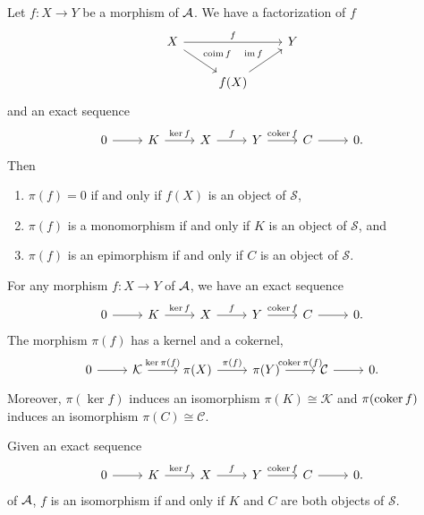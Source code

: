 \documentclass[dissertation.tex]{subfiles}
\begin{document}
\begin{lem}
  Let $f \colon X \rightarrow Y$ be a morphism of $\mathcal{A}$.  
  We have a factorization of $f$
  $$\begin{tikzcd}
    X \arrow{rd}{\coim{f}}\arrow{rr}{f} & & Y\\
    & f(X)\arrow{ur}{\im{f}} & 
  \end{tikzcd}$$
  and an exact sequence 
  $$\begin{tikzcd}
    0 \arrow{r} & K \arrow{r}{\ker{f}} & X \arrow{r}{f} & Y \arrow{r}{\coker{f}} & C \arrow{r} & 0.
  \end{tikzcd}$$
  Then
  \begin{enumerate}
  \item
    $\pi(f) = 0$ if and only if $f(X)$ is an object of $\mathcal{S}$,
  \item
    $\pi(f)$ is a monomorphism if and only if $K$ is an object of $\mathcal{S}$, and
  \item
    $\pi(f)$ is an epimorphism if and only if $C$ is an object of $\mathcal{S}$.
  \end{enumerate}
\end{lem}

\begin{lem}
  For any morphism $f \colon X \rightarrow Y$ of $\mathcal{A}$, we have an exact sequence 
  $$\begin{tikzcd}
    0 \arrow{r} & K \arrow{r}{\ker{f}} & X \arrow{r}{f} & Y \arrow{r}{\coker{f}} & C \arrow{r} & 0.
  \end{tikzcd}$$ 
  The morphism $\pi(f)$ has a kernel and a cokernel,
  $$\begin{tikzcd}
    0 \arrow{r} & \mathcal{K} \arrow{r}{\ker{\pi(f)}} & \pi(X) \arrow{r}{\pi(f)} & \pi(Y) \arrow{r}{\coker{\pi(f)}} & \mathcal{C} \arrow{r} & 0.
  \end{tikzcd}$$
  Moreover, $\pi(\ker{f})$ induces an isomorphism $\pi(K) \cong \mathcal{K}$ and $\pi(\operatorname{coker}{f})$ induces an isomorphism $\pi(C) \cong \mathcal{C}$.
\end{lem}

\begin{lem}
  Given an exact sequence 
  $$\begin{tikzcd}
    0 \arrow{r} & K \arrow{r}{\ker{f}} & X \arrow{r}{f} & Y \arrow{r}{\coker{f}} & C \arrow{r} & 0.
  \end{tikzcd}$$ 
  of $\mathcal{A}$, $f$ is an isomorphism if and only if $K$ and $C$ are both objects of $\mathcal{S}$.
\end{lem}
\end{document}
